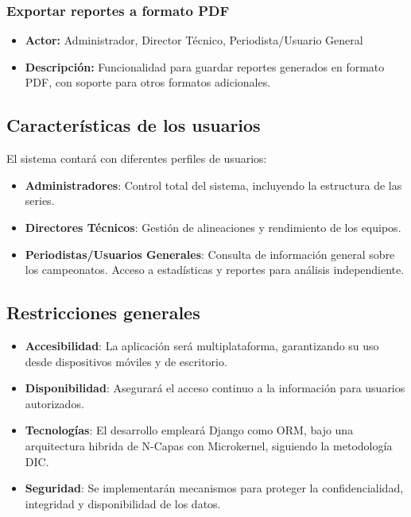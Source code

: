 \documentclass{report}
\begin{document}
\begin{enumerate}
            \subsubsection{Exportar reportes a formato PDF}
            \begin{itemize}
                \item \textbf{Actor:} Administrador, Director Técnico, Periodista/Usuario General
                \item \textbf{Descripción:} Funcionalidad para guardar reportes generados en formato PDF, con soporte para otros formatos adicionales.
            \end{itemize}

        \end{enumerate}


        \subsection*{Características de los usuarios}
        El sistema contará con diferentes perfiles de usuarios:
        \begin{itemize}
            \item \textbf{Administradores}: Control total del sistema, incluyendo la estructura de las series.
            \item \textbf{Directores Técnicos}: Gestión de alineaciones y rendimiento de los equipos.
            \item \textbf{Periodistas/Usuarios Generales}: Consulta de información general sobre los campeonatos. 
            Acceso a estadísticas y reportes para análisis independiente.
        \end{itemize}


        \subsection*{Restricciones generales}
        \begin{itemize}
            \item \textbf{Accesibilidad}: La aplicación será multiplataforma, garantizando su uso desde dispositivos 
            móviles y de escritorio.
            \item \textbf{Disponibilidad}: Asegurará el acceso continuo a la información para usuarios autorizados.
            \item \textbf{Tecnologías}: El desarrollo empleará Django como ORM, bajo una arquitectura hibrida de 
            N-Capas con Microkernel, siguiendo la metodología DIC.
            \item \textbf{Seguridad}: Se implementarán mecanismos para proteger la confidencialidad, integridad y 
            disponibilidad de los datos.
        \end{itemize}
\end{document}
